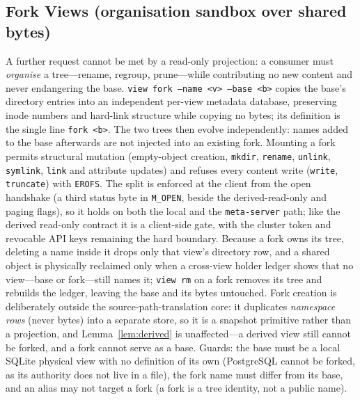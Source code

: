 \documentclass[numberedsection,acmtos]{acmart}
\begin{document}
\subsection{Fork Views (organisation sandbox over shared bytes)}
A further request cannot be met by a read-only projection: a consumer must
\emph{organise} a tree---rename, regroup, prune---while contributing no new
content and never endangering the base. \texttt{view fork --name \textless v\textgreater{} --base \textless b\textgreater{}}
copies the base's directory entries into an independent per-view metadata
database, preserving inode numbers and hard-link structure while copying no
bytes; its definition is the single line \texttt{fork \textless b\textgreater{}}. The two trees
then evolve independently: names added to the base afterwards are not injected
into an existing fork. Mounting a fork permits structural mutation
(empty-object creation, \texttt{mkdir}, \texttt{rename}, \texttt{unlink},
\texttt{symlink}, \texttt{link} and attribute updates) and refuses every
content write (\texttt{write}, \texttt{truncate}) with \texttt{EROFS}. The
split is enforced at the client from the open handshake (a third status byte
in \texttt{M\_OPEN}, beside the derived-read-only and paging flags), so it
holds on both the local and the \texttt{meta-server} path; like the derived
read-only contract it is a client-side gate, with the cluster token and
revocable API keys remaining the hard boundary. Because a fork owns its tree,
deleting a name inside it drops only that view's directory row, and a shared
object is physically reclaimed only when a cross-view holder ledger shows that
no view---base or fork---still names it; \texttt{view rm} on a fork removes
its tree and rebuilds the ledger, leaving the base and its bytes untouched.
Fork creation is deliberately outside the source-path-translation core: it
duplicates \emph{namespace rows} (never bytes) into a separate store, so it is
a snapshot primitive rather than a projection, and Lemma~\ref{lem:derived}
is unaffected---a derived view still cannot be forked, and a fork cannot serve
as a base. Guards: the base must be a local SQLite physical view with no
definition of its own (PostgreSQL cannot be forked, as its authority does not
live in a file), the fork name must differ from its base, and an alias may not
target a fork (a fork is a tree identity, not a public name).
\end{document}

